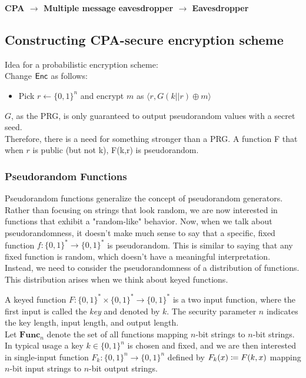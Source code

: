 \documentclass[12pt]{article}
\begin{document}
\textbf{CPA $\rightarrow$ Multiple message eavesdropper $\rightarrow$ Eavesdropper}

\subsection{Constructing CPA-secure encryption scheme}
Idea for a probabilistic encryption scheme:\\
Change $\operatorname{\mathsf{Enc}}$ as follows:
\begin{itemize}
\item Pick $r \leftarrow \{0,1\}^n$ and encrypt $m$ as $\langle r, G(k||r)\oplus m \rangle$
\end{itemize}
$G$, as the PRG, is only guaranteed to output pseudorandom values with a secret seed.\\
Therefore, there is a need for something stronger than a PRG. A function F  that when $r$ is public (but not k),  F(k,r) is pseudorandom.

\subsubsection{Pseudorandom Functions}
Pseudorandom functions generalize the concept of pseudorandom generators. Rather than focusing on strings that look random, we are now interested in functions that exhibit a "random-like" behavior. Now, when we talk about pseudorandomness, it doesn't make much sense to say that a specific, fixed function $f: \{0,1\}^* \rightarrow \{0,1\}^*$ is pseudorandom. This is similar to saying that any fixed function is random, which doesn't have a meaningful interpretation. Instead, we need to consider the pseudorandomness of a distribution of functions. This distribution arises when we think about keyed functions.

A keyed function $F: \{0,1\}^* \times \{0,1\}^* \rightarrow \{0,1\}^*$ is a two input function, where the first input is called the \emph{key} and denoted by $k$. The security parameter $n$ indicates the key length, input length, and output length. \\

Let $\textbf{Func}_n$ denote the set of all functions mapping $n$-bit strings to $n$-bit strings.
In typical usage a key $k \in \{0,1\}^n$ is chosen and fixed, and we are then interested in single-input function $F_k:  \{0,1\}^n \rightarrow \{0,1\}^n$ defined by $F_k(x) \coloneqq F(k,x)$ mapping $n$-bit input strings to $n$-bit output strings.\\
\end{document}
